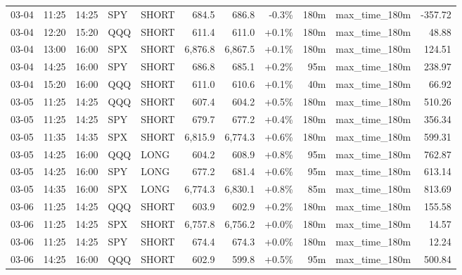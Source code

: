 \documentclass[11pt,a4paper,twoside]{article}
\begin{document}
\begin{center}
\begin{longtable}{>{\color{txtmain}}l l l l l r r r r >{\color{txtmain}}l r}
03-04 & 11:25 & 14:25 & SPY & SHORT & 684.5 & 686.8 & \textcolor{lossred}{-0.3\%} & 180m & max\_time\_180m & \textcolor{lossred}{-357.72} \\
03-04 & 12:20 & 15:20 & QQQ & SHORT & 611.4 & 611.0 & \textcolor{wingreen}{+0.1\%} & 180m & max\_time\_180m & \textcolor{wingreen}{48.88} \\
03-04 & 13:00 & 16:00 & SPX & SHORT & 6,876.8 & 6,867.5 & \textcolor{wingreen}{+0.1\%} & 180m & max\_time\_180m & \textcolor{wingreen}{124.51} \\
03-04 & 14:25 & 16:00 & SPY & SHORT & 686.8 & 685.1 & \textcolor{wingreen}{+0.2\%} & 95m & max\_time\_180m & \textcolor{wingreen}{238.97} \\
03-04 & 15:20 & 16:00 & QQQ & SHORT & 611.0 & 610.6 & \textcolor{wingreen}{+0.1\%} & 40m & max\_time\_180m & \textcolor{wingreen}{66.92} \\
03-05 & 11:25 & 14:25 & QQQ & SHORT & 607.4 & 604.2 & \textcolor{wingreen}{+0.5\%} & 180m & max\_time\_180m & \textcolor{wingreen}{510.26} \\
03-05 & 11:25 & 14:25 & SPY & SHORT & 679.7 & 677.2 & \textcolor{wingreen}{+0.4\%} & 180m & max\_time\_180m & \textcolor{wingreen}{356.34} \\
03-05 & 11:35 & 14:35 & SPX & SHORT & 6,815.9 & 6,774.3 & \textcolor{wingreen}{+0.6\%} & 180m & max\_time\_180m & \textcolor{wingreen}{599.31} \\
03-05 & 14:25 & 16:00 & QQQ & LONG & 604.2 & 608.9 & \textcolor{wingreen}{+0.8\%} & 95m & max\_time\_180m & \textcolor{wingreen}{762.87} \\
03-05 & 14:25 & 16:00 & SPY & LONG & 677.2 & 681.4 & \textcolor{wingreen}{+0.6\%} & 95m & max\_time\_180m & \textcolor{wingreen}{613.14} \\
03-05 & 14:35 & 16:00 & SPX & LONG & 6,774.3 & 6,830.1 & \textcolor{wingreen}{+0.8\%} & 85m & max\_time\_180m & \textcolor{wingreen}{813.69} \\
03-06 & 11:25 & 14:25 & QQQ & SHORT & 603.9 & 602.9 & \textcolor{wingreen}{+0.2\%} & 180m & max\_time\_180m & \textcolor{wingreen}{155.58} \\
03-06 & 11:25 & 14:25 & SPX & SHORT & 6,757.8 & 6,756.2 & \textcolor{wingreen}{+0.0\%} & 180m & max\_time\_180m & \textcolor{wingreen}{14.57} \\
03-06 & 11:25 & 14:25 & SPY & SHORT & 674.4 & 674.3 & \textcolor{wingreen}{+0.0\%} & 180m & max\_time\_180m & \textcolor{wingreen}{12.24} \\
03-06 & 14:25 & 16:00 & QQQ & SHORT & 602.9 & 599.8 & \textcolor{wingreen}{+0.5\%} & 95m & max\_time\_180m & \textcolor{wingreen}{500.84} \\

\end{longtable}
\end{center}
\end{document}
